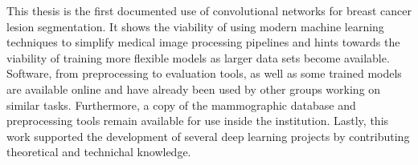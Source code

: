 This thesis is the first documented use of convolutional networks for breast cancer lesion segmentation. It shows the viability of using modern machine learning techniques to simplify medical image processing pipelines and hints towards the viability of training more flexible models as larger data sets become available. Software, from preprocessing to evaluation tools, as well as some trained models are available online and have already been used by other groups working on similar tasks. Furthermore, a copy of the mammographic database and preprocessing tools remain available for use inside the institution. Lastly, this work supported the development of several deep learning projects by contributing theoretical and technichal knowledge.
\begin{comment}
 Describe the exact contributions of this thesis

 software to transform a new database into a segementaton problem
 software tools for evaluation.
 first result in segementation
 convolutional networks as a concept
 the trained model
 the start of deep learning on campus.

    What is new, different, better, significant?
    Why is the world a better place because of what you've done?
    What have you contributed to the field of research?
    What is now known/possible/better because of your thesis?
\end{comment}
